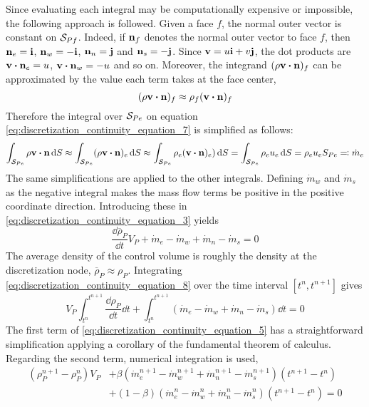 Since evaluating each integral may be computationally expensive or impossible,
the following approach is followed. Given a face $f$, the normal outer vector is
constant on $\mathcal{S}_{Pf}$. Indeed, if $\vb{n}_f$ denotes the normal outer vector to
face $f$, then $\vb{n}_e = \vb{i}$, $\vb{n}_w = -\vb{i}$, $\vb{n}_n = \vb{j}$
and $\vb{n}_s = -\vb{j}$. Since $\vb{v} = u \vb{i} + v \vb{j}$, the dot products
are $\vb{v} \vdot \vb{n}_e = u$, $\vb{v} \vdot \vb{n}_w = -u$ and so on.
Moreover, the integrand $(\rho \vb{v} \vdot \vb{n})_f$ can be approximated by
the value each term takes at the face center, \ie
\begin{equation*}
	(\rho \vb{v} \vdot \vb{n})_f \approx \rho_f (\vb{v} \vdot \vb{n})_f
\end{equation*}
Therefore the integral over $\mathcal{S}_{Pe}$ on equation
\eqref{eq:discretization_continuity_equation_7} is simplified as follows:
\begin{equation*}
	\int_{\cs{Pe}} \rho \vb{v} \vdot \vb{n} \dd{S} \approx
	\int_{\cs{Pe}} (\rho \vb{v} \vdot \vb{n})_e \dd{S} \approx
	\int_{\cs{Pe}} \rho_e (\vb{v} \vdot \vb{n})_e) \dd{S} = 
	\int_{\cs{Pe}} \rho_e u_e \dd{S} = 
	\rho_e u_e S_{Pe} \eqqcolon \dot{m}_e
\end{equation*}
The same simplifications are applied to the other integrals. Defining
$\dot{m}_w$ and $\dot{m}_s$ as the negative integral makes the mass flow terms
be positive in the positive coordinate direction. Introducing these in
\eqref{eq:discretization_continuity_equation_3} yields
\begin{equation} \label{eq:discretization_continuity_equation_8}
	\frac{\dd \overline{\rho}_P}{\dd{t}} V_P 
	+ \dot{m}_e - \dot{m}_w + \dot{m}_n - \dot{m}_s = 0
\end{equation}
The average density of the control volume is roughly the density at the
discretization node, \ie $\overline{\rho}_P \approx \rho_P$. Integrating
\eqref{eq:discretization_continuity_equation_8} over the time interval $[t^n,
t^{n+1}]$ gives
\begin{equation} \label{eq:discretization_continuity_equation_5}
	V_P \int_{t^n}^{t^{n+1}} \frac{\dd \rho_P}{\dd{t}} \dd{t} + 
	\int_{t^n}^{t^{n+1}} ( \dot{m}_e - \dot{m}_w + \dot{m}_n - \dot{m}_s ) \dd{t} = 0
\end{equation}
The first term of \eqref{eq:discretization_continuity_equation_5} has a
straightforward simplification applying a corollary of the fundamental theorem
of calculus. Regarding the second term, numerical integration is used,
\begin{align*} 
	(\rho_P^{n+1} - \rho_P^n) V_P
	&+ \beta (\dot{m}_e^{n+1} - \dot{m}_w^{n+1} + \dot{m}_n^{n+1} - \dot{m}_s^{n+1}) (t^{n+1} - t^n) \\
	&+ (1 - \beta) (\dot{m}_e^n - \dot{m}_w^n + \dot{m}_n^n - \dot{m}_s^n) (t^{n+1} - t^n) = 0
\end{align*}
